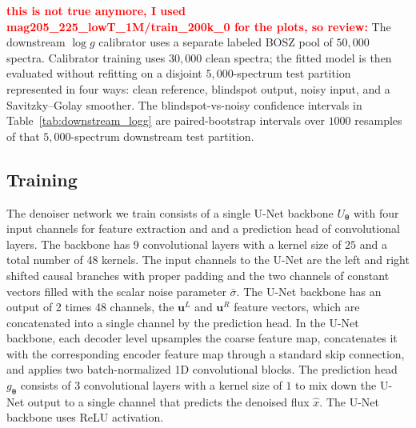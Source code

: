 \documentclass[twocolumn]{aastex7}
\newcommand{\ld}[1]{\textcolor{red}{\textbf{#1}}}
\newcommand{\m}[1]{\boldsymbol{#1}}
\begin{document}
\ld{this is not true anymore, I used mag205\_225\_lowT\_1M/train\_200k\_0 for the plots, so review:} The downstream $\log g$ calibrator uses a separate labeled BOSZ pool of $50{,}000$ spectra. Calibrator training uses $30{,}000$ clean spectra; the fitted model is then evaluated without refitting on a disjoint $5{,}000$-spectrum test partition represented in four ways: clean reference, blindspot output, noisy input, and a Savitzky--Golay smoother. The blindspot-vs-noisy confidence intervals in Table~\ref{tab:downstream_logg} are paired-bootstrap intervals over $1000$ resamples of that $5{,}000$-spectrum downstream test partition.

\subsection{Training}
\label{sec:training}
The denoiser network we train consists of a single U-Net backbone $U_{\m{\theta}}$ with four input channels for feature extraction and and a prediction head of convolutional layers. The backbone has 9 convolutional layers with a kernel size of $25$ and a total number of 48 kernels. The input channels to the U-Net are the left and right shifted causal branches with proper padding and the two channels of constant vectors filled with the scalar noise parameter $\bar{\sigma}$. The U-Net backbone has an output of 2 times 48 channels, the $\m{u}^{L}$ and $\m{u}^{R}$ feature vectors, which are concatenated into a single channel by the prediction head. 
In the U-Net backbone, each decoder level upsamples the coarse feature map, concatenates it with the corresponding encoder feature map through a standard skip connection, and applies two batch-normalized 1D convolutional blocks.
The prediction head $g_{\m{\theta}}$ consists of 3 convolutional layers with a kernel size of $1$ to mix down the U-Net output to a single channel that predicts the denoised flux $\hat{x}$. The U-Net backbone uses ReLU activation.
\end{document}
